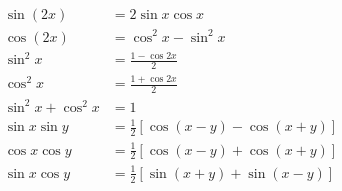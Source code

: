 \begin{align*}
\sin(2x)  &= 2 \sin x \cos x\\
\cos(2x)  &= \cos^2 x - \sin^2 x\\
\sin^2 x  &= \frac{1 - \cos 2x}{2}\\
  \cos^2 x  &= \frac{1 + \cos 2x}{2}\\
  \sin^2 x + \cos^2 x &= 1\\
  \sin x \sin y &= \frac{1}{2}\left[\cos(x - y) - \cos(x + y)\right]\\
  \cos x \cos y &= \frac{1}{2}\left[\cos(x - y) + \cos(x + y)\right]\\
  \sin x \cos y &= \frac{1}{2}\left[\sin(x + y) + \sin(x - y)\right]\\
  \end{align*}
